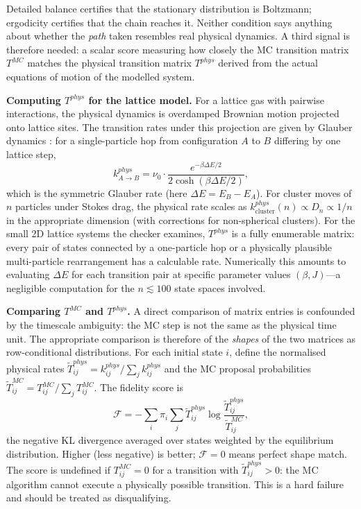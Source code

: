 \documentclass[10.5pt]{article}
\begin{document}
Detailed balance certifies that the stationary distribution is
Boltzmann; ergodicity certifies that the chain reaches it.  Neither
condition says anything about whether the \emph{path} taken resembles
real physical dynamics.  A third signal is therefore needed: a scalar
score measuring how closely the MC transition matrix $T^{MC}$ matches
the physical transition matrix $T^{phys}$ derived from the actual
equations of motion of the modelled system.

\textbf{Computing $T^{phys}$ for the lattice model.}  For a lattice
gas with pairwise interactions, the physical dynamics is overdamped
Brownian motion projected onto lattice sites.  The transition rates
under this projection are given by Glauber dynamics \cite{glauber1963}:
for a single-particle hop from configuration $A$ to $B$ differing by
one lattice step,
\[
  k^{phys}_{A \to B} = \nu_0 \cdot
    \frac{e^{-\beta\Delta E/2}}{2\cosh(\beta\Delta E/2)},
\]
which is the symmetric Glauber rate (here $\Delta E = E_B - E_A$).
For cluster moves of $n$ particles under Stokes drag, the physical
rate scales as $k^{phys}_\text{cluster}(n) \propto D_n \propto 1/n$
in the appropriate dimension (with corrections for non-spherical
clusters).  For the small 2D lattice systems the checker examines,
$T^{phys}$ is a fully enumerable matrix: every pair of states connected
by a one-particle hop or a physically plausible multi-particle rearrangement
has a calculable rate.  Numerically this amounts to evaluating $\Delta E$
for each transition pair at specific parameter values $(\beta, J)$---a
negligible computation for the $n \lesssim 100$ state spaces involved.

\textbf{Comparing $T^{MC}$ and $T^{phys}$.}  A direct comparison of
matrix entries is confounded by the timescale ambiguity: the MC step
is not the same as the physical time unit.  The appropriate comparison
is therefore of the \emph{shapes} of the two matrices as row-conditional
distributions.  For each initial state $i$, define the normalised
physical rates $\tilde{T}^{phys}_{ij} = k^{phys}_{ij}/\sum_j
k^{phys}_{ij}$ and the MC proposal probabilities $\tilde{T}^{MC}_{ij}
= T^{MC}_{ij} / \sum_j T^{MC}_{ij}$.  The fidelity score is
\[
  \mathcal{F} = -\sum_i \pi_i \sum_j \tilde{T}^{phys}_{ij}
    \log \frac{\tilde{T}^{phys}_{ij}}{\tilde{T}^{MC}_{ij}},
\]
the negative KL divergence averaged over states weighted by the
equilibrium distribution.  Higher (less negative) is better; $\mathcal{F}
= 0$ means perfect shape match.  The score is undefined if $T^{MC}_{ij}
= 0$ for a transition with $\tilde{T}^{phys}_{ij} > 0$: the MC
algorithm cannot execute a physically possible transition.  This is a
hard failure and should be treated as disqualifying.
\end{document}
